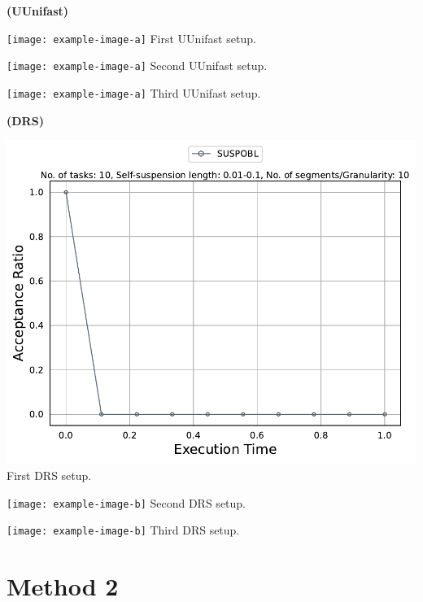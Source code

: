 \documentclass[]{article}
\begin{document}
	\begin{minipage}[t]{0.48\linewidth}
		\centering
		\textbf{(UUnifast)}
		\vspace{0.3cm}
		
		\texttt{[image: example-image-a]}
		First UUnifast setup.
		\vspace{0.3cm}
		
		\texttt{[image: example-image-a]}
		Second UUnifast setup.
		\vspace{0.3cm}
		
		\texttt{[image: example-image-a]}
		Third UUnifast setup.
		\vspace{0.3cm}
		
		
	\end{minipage}\hfill
	\begin{minipage}[t]{0.48\linewidth}
		\centering
		\textbf{(DRS)}
		\vspace{0.3cm}
		
		\includegraphics[width=\linewidth]{susobl_example_plot.pdf}
		First DRS setup.
		\vspace{0.3cm}
		
		\texttt{[image: example-image-b]}
		Second DRS setup.
		\vspace{0.3cm}
		
		\texttt{[image: example-image-b]}
		Third DRS setup.
		\vspace{0.3cm}
	\end{minipage}

	\clearpage
	\section{Method 2}
	
\end{document}
